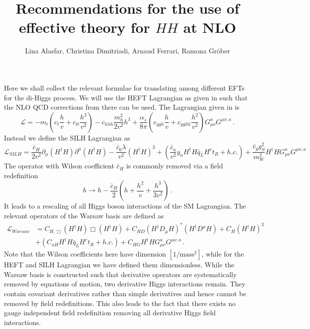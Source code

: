 \documentclass[12pt]{article}
\title{\huge{\bf{Recommendations for the use of effective theory for $HH$ at NLO}}}
\author{Lina Alasfar, Christina Dimitriadi, Arnaud Ferrari, Ramona Gr\"ober}
\begin{document}
\maketitle


Here we shall collect the relevant formulae for translating 
among different EFTs for the di-Higgs process.
We will use the HEFT Lagrangian as given in \cite{Buchalla:2018yce}
such that the NLO QCD corrections from there can be used. The Lagrangian given in \cite{Buchalla:2018yce} is
\begin{equation}
\mathcal{L}=-m_t\left( c_t \frac{h}{v}+c_{tt} \frac{h^2}{v^2}\right)-c_{hhh}\frac{m_h^2}{2 v^2}h^3+\frac{\alpha_s}{8 \pi}\left(c_{ggh}\frac{h}{v} +c_{gghh}\frac{h^2}{v^2}  \right)G_{\mu\nu}^a G^{\mu\nu,a}\,.
\end{equation}
Instead we define the SILH Lagrangian \cite{Contino:2013kra} as
\begin{equation}
\mathcal{L}_{SILH}=\frac{\bar{c}_H}{2 v^2}\partial_{\mu}(H^{\dagger}H ) \partial^{\mu}(H^{\dagger}H )-\frac{\bar{c}_6 \lambda}{v^2}(H^{\dagger}H)^3+\left(\frac{\bar{c}_u}{v^2} y_u H^{\dagger}{H}\bar{q}_LH^c t_R + h.c.\right)+\frac{\bar{c}_g g_S^2}{m_W^2} H^{\dagger} H G_{\mu\nu}^a G^{\mu\nu,a}
\end{equation}
The operator with Wilson coefficient $\bar{c}_H$ is commonly removed via a field redefinition
\begin{equation}
h \to h -\frac{\bar{c}_H}{2}\left( h +\frac{h^2}{v}+\frac{h^3}{3v^2}\right) \,.\label{SILH:field}
\end{equation}
It leads to a rescaling of all Higgs boson interactions of the SM Lagrangian.
The relevant operators of the Warsaw basis \cite{Grzadkowski:2010es} are defined as
\begin{equation}
\begin{split}
\mathcal{L}_{Warsaw}&=C_{H,\Box} (H^{\dagger} H)\Box (H^{\dagger } H)+ C_{HD}(H^{\dagger} D_{\mu}H)^*(H^{\dagger}D^{\mu}H)+ C_H (H^{\dagger}H)^3 \\ &+\left( C_{uH} H^{\dagger}{H}\bar{q}_LH^c t_R + h.c.\right)+C_{HG} H^{\dagger} H G_{\mu\nu}^a G^{\mu\nu,a}\,.
\end{split}
\end{equation}
Note that the Wilson coefficients here have dimension $[1/\text{mass}^2]$, while for the HEFT and SILH Lagrangian we have defined them dimensionless.
While the Warsaw basis is constructed such that derivative operators are systematically removed by equations of motion, two derivative Higgs interactions remain. They contain covariant derivatives rather than simple derivatives and hence cannot be removed by field redefinitions. This also leads to the fact that there exists no gauge independent field redefinition removing all derivative Higgs field interactions. 
\end{document}
